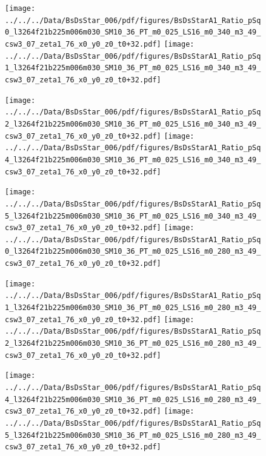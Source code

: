 \documentclass[a4paper,10pt]{article}
\begin{document}
\begin{figure}[p]
 \texttt{[image: ../../../Data/BsDsStar\_006/pdf/figures/BsDsStarA1\_Ratio\_pSq0\_l3264f21b225m006m030\_SM10\_36\_PT\_m0\_025\_LS16\_m0\_340\_m3\_49\_csw3\_07\_zeta1\_76\_x0\_y0\_z0\_t0+32.pdf]} 
 \texttt{[image: ../../../Data/BsDsStar\_006/pdf/figures/BsDsStarA1\_Ratio\_pSq1\_l3264f21b225m006m030\_SM10\_36\_PT\_m0\_025\_LS16\_m0\_340\_m3\_49\_csw3\_07\_zeta1\_76\_x0\_y0\_z0\_t0+32.pdf]} 
 \end{figure}
\begin{figure}[p]
 \texttt{[image: ../../../Data/BsDsStar\_006/pdf/figures/BsDsStarA1\_Ratio\_pSq2\_l3264f21b225m006m030\_SM10\_36\_PT\_m0\_025\_LS16\_m0\_340\_m3\_49\_csw3\_07\_zeta1\_76\_x0\_y0\_z0\_t0+32.pdf]} 
 \texttt{[image: ../../../Data/BsDsStar\_006/pdf/figures/BsDsStarA1\_Ratio\_pSq4\_l3264f21b225m006m030\_SM10\_36\_PT\_m0\_025\_LS16\_m0\_340\_m3\_49\_csw3\_07\_zeta1\_76\_x0\_y0\_z0\_t0+32.pdf]} 
 \end{figure}
\begin{figure}[p]
 \texttt{[image: ../../../Data/BsDsStar\_006/pdf/figures/BsDsStarA1\_Ratio\_pSq5\_l3264f21b225m006m030\_SM10\_36\_PT\_m0\_025\_LS16\_m0\_340\_m3\_49\_csw3\_07\_zeta1\_76\_x0\_y0\_z0\_t0+32.pdf]} 
 \texttt{[image: ../../../Data/BsDsStar\_006/pdf/figures/BsDsStarA1\_Ratio\_pSq0\_l3264f21b225m006m030\_SM10\_36\_PT\_m0\_025\_LS16\_m0\_280\_m3\_49\_csw3\_07\_zeta1\_76\_x0\_y0\_z0\_t0+32.pdf]} 
 \end{figure}
\clearpage
\begin{figure}[p]
 \texttt{[image: ../../../Data/BsDsStar\_006/pdf/figures/BsDsStarA1\_Ratio\_pSq1\_l3264f21b225m006m030\_SM10\_36\_PT\_m0\_025\_LS16\_m0\_280\_m3\_49\_csw3\_07\_zeta1\_76\_x0\_y0\_z0\_t0+32.pdf]} 
 \texttt{[image: ../../../Data/BsDsStar\_006/pdf/figures/BsDsStarA1\_Ratio\_pSq2\_l3264f21b225m006m030\_SM10\_36\_PT\_m0\_025\_LS16\_m0\_280\_m3\_49\_csw3\_07\_zeta1\_76\_x0\_y0\_z0\_t0+32.pdf]} 
 \end{figure}
\begin{figure}[p]
 \texttt{[image: ../../../Data/BsDsStar\_006/pdf/figures/BsDsStarA1\_Ratio\_pSq4\_l3264f21b225m006m030\_SM10\_36\_PT\_m0\_025\_LS16\_m0\_280\_m3\_49\_csw3\_07\_zeta1\_76\_x0\_y0\_z0\_t0+32.pdf]} 
 \texttt{[image: ../../../Data/BsDsStar\_006/pdf/figures/BsDsStarA1\_Ratio\_pSq5\_l3264f21b225m006m030\_SM10\_36\_PT\_m0\_025\_LS16\_m0\_280\_m3\_49\_csw3\_07\_zeta1\_76\_x0\_y0\_z0\_t0+32.pdf]} 
 \end{figure}
\clearpage
\end{document}
